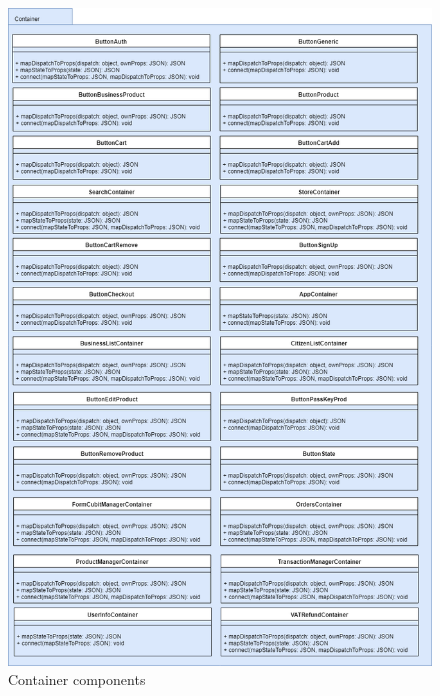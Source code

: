 \begin{figure}[H]
	\centering\includegraphics[scale = 0.42]{res/images/Container.png}
	\caption{Container components}
\end{figure}
